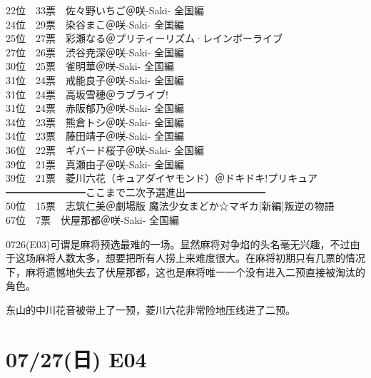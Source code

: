 {    22位　33票　佐々野いちご＠咲-Saki- 全国編                                               \\
    24位　29票　染谷まこ＠咲-Saki- 全国編                                                   \\
    25位　27票　彩瀬なる＠プリティーリズム·レインボーライブ                                \\
    27位　26票　渋谷尭深＠咲-Saki- 全国編                                                   \\
    30位　25票　雀明華＠咲-Saki- 全国編                                                     \\
    31位　24票　戒能良子＠咲-Saki- 全国編                                                   \\
    31位　24票　高坂雪穂＠ラブライブ!                                                       \\
    31位　24票　赤阪郁乃＠咲-Saki- 全国編                                                   \\
    34位　23票　熊倉トシ＠咲-Saki- 全国編                                                   \\
    34位　23票　藤田靖子＠咲-Saki- 全国編                                                   \\
    36位　22票　ギバード桜子＠咲-Saki- 全国編                                               \\
    39位　21票　真瀬由子＠咲-Saki- 全国編                                                   \\
    39位　21票　菱川六花（キュアダイヤモンド）＠ドキドキ!プリキュア                         \\
    ━━━━━━━━ここまで二次予選進出━━━━━━━━                                    \\
    50位　15票　志筑仁美＠劇場版 魔法少女まどか☆マギカ[新編]叛逆の物語                     \\
    67位　7票　伏屋那都＠咲-Saki- 全国編
}

0726(E03)可谓是麻将预选最难的一场。显然麻将对争焰的头名毫无兴趣，不过由于这场麻将人数太多，想要把所有人捞上来难度很大。在麻将初期只有几票的情况下，麻将遗憾地失去了伏屋那都，这也是麻将唯一一个没有进入二预直接被淘汰的角色。

东山的中川花音被带上了一预，菱川六花非常险地压线进了二预。

\section{07/27(日) E04}

